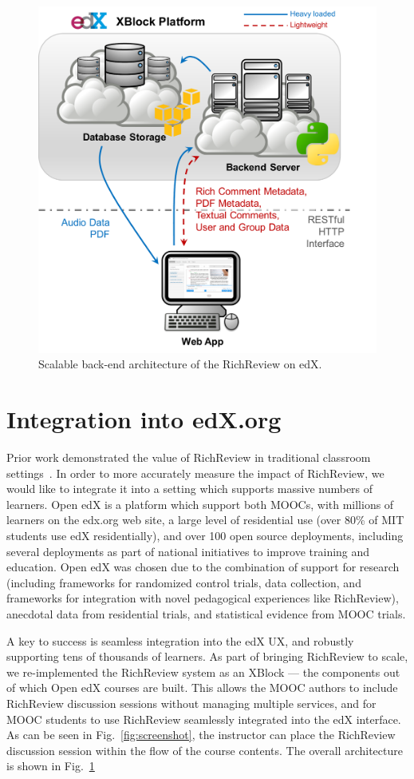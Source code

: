 \documentclass{sigchi}
\begin{document}
\begin{figure}[!h]
\centering
\includegraphics[width=0.85\columnwidth]{figure_architecture}
\caption{Scalable back-end architecture of the RichReview on edX.}
\label{fig:scalable}
\end{figure}

\section{Integration into edX.org} 

Prior work demonstrated the value of RichReview in traditional classroom settings~\cite{yoon2015richreview}.
In order to more accurately measure the impact of RichReview, we would like to integrate it into a setting which supports massive numbers of learners. 
Open edX is a platform which support both MOOCs, with millions of learners on the edx.org web site, a large level of residential use (over 80\% of MIT students use edX residentially), and over 100 open source deployments, including several deployments as part of national initiatives to improve training and education.
Open edX was chosen due to the combination of support for research (including frameworks for randomized control trials, data collection, and frameworks for integration with novel pedagogical experiences like RichReview), anecdotal data from residential trials, and statistical evidence from MOOC trials. 

A key to success is seamless integration into the edX UX, and robustly supporting tens of thousands of learners. As part of bringing RichReview to scale, we re-implemented the RichReview system as an XBlock --- the components out of which Open edX courses are built.
This allows the MOOC authors to include RichReview discussion sessions without managing multiple services, and for MOOC students to use RichReview seamlessly integrated into the edX interface.
As can be seen in Fig.~\ref{fig:screenshot}, the instructor can place the RichReview discussion session within the flow of the course contents. The overall architecture is shown in Fig.~\ref{fig:scalable}
\end{document}
